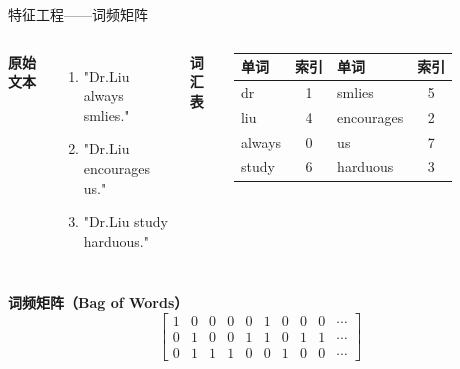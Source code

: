 \documentclass{beamer}
\begin{document}
\begin{frame}{特征工程——词频矩阵}
    \begin{columns}
        \hspace{0.7cm}
        \textbf{原始文本}
        \begin{enumerate}
            \item "Dr.Liu always smlies."
            \item "Dr.Liu encourages us."
            \item "Dr.Liu study harduous."
        \end{enumerate}

        \textbf{词汇表} \\
        \vspace{0.2cm}
        \begin{tabular}{lc||lc}
            \hline \hline
            单词 & 索引 & 单词 & 索引 \\
            \hline
            dr & 1 & smlies & 5\\
            liu & 4 & encourages & 2\\
            always & 0 & us & 7\\
            study & 6 & harduous & 3\\
            \hline
        \end{tabular}
    \end{columns}

    \vspace{0.5cm}
    \textbf{词频矩阵（Bag of Words）}
    \[
    \begin{bmatrix}
        1 & 0 & 0 & 0 & 0 & 1 & 0 & 0 & 0 & \cdots \\
        0 & 1 & 0 & 0 & 1 & 1 & 0 & 1 & 1 & \cdots \\
        0 & 1 & 1 & 1 & 0 & 0 & 1 & 0 & 0 & \cdots
    \end{bmatrix}
    \]
\end{frame}
\end{document}
